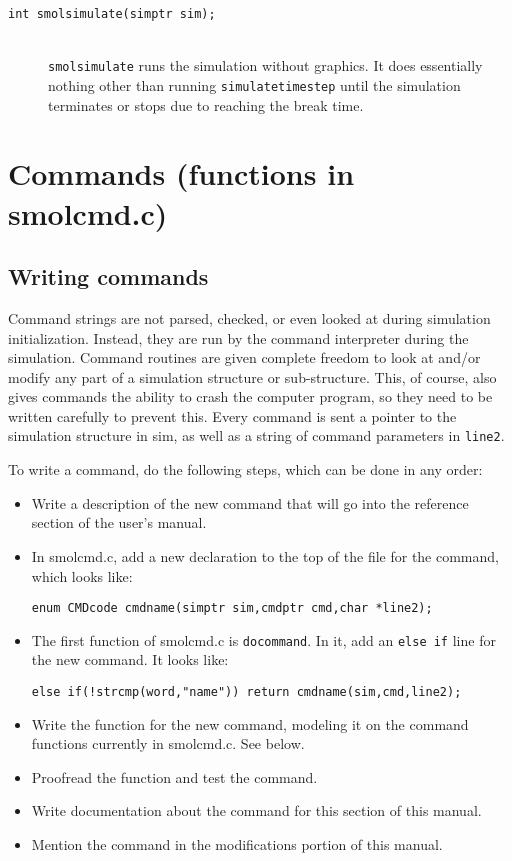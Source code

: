 \documentclass {scrbook}
\newcommand {\ttt} {\texttt}
\begin{document}
\begin{description}
\item[\ttt{int smolsimulate(simptr sim);}]
\hfill \\
\ttt{smolsimulate} runs the simulation without graphics. It does essentially nothing other than running \ttt{simulatetimestep} until the simulation terminates or stops due to reaching the break time.

\end{description}

\section{Commands (functions in smolcmd.c)}

\subsection*{Writing commands}

Command strings are not parsed, checked, or even looked at during simulation initialization. Instead, they are run by the command interpreter during the simulation. Command routines are given complete freedom to look at and/or modify any part of a simulation structure or sub-structure. This, of course, also gives commands the ability to crash the computer program, so they need to be written carefully to prevent this. Every command is sent a pointer to the simulation structure in sim, as well as a string of command parameters in \ttt{line2}.

To write a command, do the following steps, which can be done in any order:

\begin{itemize}
\item Write a description of the new command that will go into the reference section of the user's manual.
\item In smolcmd.c, add a new declaration to the top of the file for the command, which looks like:
\begin{lstlisting}
enum CMDcode cmdname(simptr sim,cmdptr cmd,char *line2);
\end{lstlisting}
\item The first function of smolcmd.c is \ttt{docommand}. In it, add an \ttt{else if} line for the new command. It looks like:
\begin{lstlisting}
else if(!strcmp(word,"name")) return cmdname(sim,cmd,line2);
\end{lstlisting}
\item Write the function for the new command, modeling it on the command functions currently in smolcmd.c. See below.
\item Proofread the function and test the command.
\item Write documentation about the command for this section of this manual.
\item Mention the command in the modifications portion of this manual.
\end{itemize}
\end{document}

